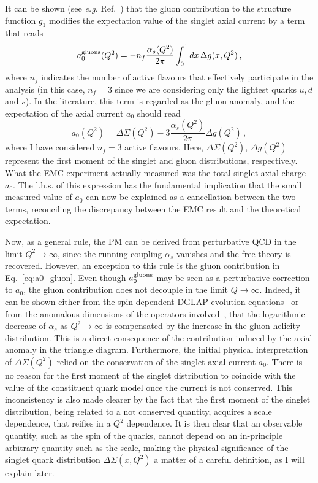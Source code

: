 It can be shown (see \textit{e.g.} Ref.~\cite{Anselmino:1993tc}) that the gluon contribution to the structure function $g_1$ modifies the expectation value of the singlet axial current by a term that reads
\begin{equation}
  a_{0}^{\textrm{gluons}}(Q^2) = - n_{f} \frac{\alpha_s(Q^2)}{2\pi} \int_{0}^{1} dx \, \Delta g (x, Q^2) \,,
\end{equation}
where $n_{f}$ indicates the number of active flavours that effectively participate in the analysis (in this case, $n_f = 3$ since we are considering only the lightest quarks $u,d$ and $s$). In the literature, this term is regarded as the gluon anomaly, and the expectation of the axial current $a_0$ should read
\begin{equation}
  a_{0} (Q^2) = \Delta \Sigma (Q^2) - 3 \frac{\alpha_{s}(Q^2)}{2\pi} \Delta g (Q^2) \,,
  \label{eq:a0_gluon}
\end{equation}
where I have considered $n_f = 3$ active flavours. Here, $\Delta \Sigma(Q^2)$, $\Delta g(Q^2)$ represent the first moment of the singlet and gluon distributions, respectively. What the EMC experiment actually measured was the total singlet axial charge $a_0$. The l.h.s. of this expression has the fundamental implication that the small measured value of $a_0$ can now be explained as a cancellation between the two terms, reconciling the discrepancy between the EMC result and the theoretical expectation.\par Now, as a general rule, the PM can be derived from perturbative QCD in the limit $Q^2 \rightarrow \infty$, since the running coupling $\alpha_s$ vanishes and the free-theory is recovered. However, an exception to this rule is the gluon contribution in Eq.~\eqref{eq:a0_gluon}. Even though $a_{0}^{\textrm{gluons}}$ may be seen as a perturbative correction to $a_0$, the gluon contribution does not decouple in the limit $Q \rightarrow \infty$. Indeed, it can be shown either from the spin-dependent DGLAP evolution equations~\cite{Borah:2012ey} or from the anomalous dimensions of the operators involved~\cite{Anselmino:1994gn}, that the logarithmic decrease of $\alpha_s$ as $Q^2 \rightarrow \infty$ is compensated by the increase in the gluon helicity distribution. This is a direct consequence of the contribution induced by the axial anomaly in the triangle diagram. Furthermore, the initial physical interpretation of $\Delta \Sigma (Q^2)$ relied on the conservation of the singlet axial current $a_0$. There is no reason for the first moment of the singlet distribution to coincide with the value of the constituent quark model once the current is not conserved. This inconsistency is also made clearer by the fact that the first moment of the singlet distribution, being related to a not conserved quantity, acquires a scale dependence, that reifies in a $Q^2$ dependence. It is then clear that an observable quantity, such as the spin of the quarks, cannot depend on an in-principle arbitrary quantity such as the scale, making the physical significance of the singlet quark distribution $\Delta \Sigma(x,Q^2)$ a matter of a careful definition, as I will explain later.%

